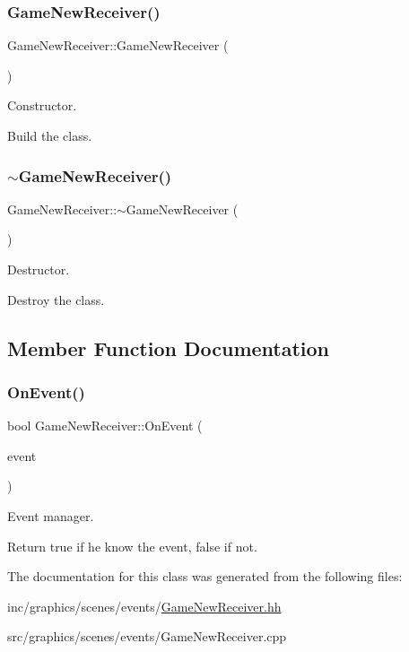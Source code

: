 \subsubsection{\texorpdfstring{Game\+New\+Receiver()}{GameNewReceiver()}}
{\footnotesize\ttfamily Game\+New\+Receiver\+::\+Game\+New\+Receiver (\begin{DoxyParamCaption}{ }\end{DoxyParamCaption})}



Constructor. 

Build the class. \mbox{\label{classGameNewReceiver_ab92b6653b56d291853a4e2f737eaf6fd}} 
\subsubsection{\texorpdfstring{$\sim$\+Game\+New\+Receiver()}{~GameNewReceiver()}}
{\footnotesize\ttfamily Game\+New\+Receiver\+::$\sim$\+Game\+New\+Receiver (\begin{DoxyParamCaption}{ }\end{DoxyParamCaption})}



Destructor. 

Destroy the class. 

\subsection{Member Function Documentation}
\mbox{\label{classGameNewReceiver_ad9ec097d8b46946ed1a21c24463fc0b6}} 
\subsubsection{\texorpdfstring{On\+Event()}{OnEvent()}}
{\footnotesize\ttfamily bool Game\+New\+Receiver\+::\+On\+Event (\begin{DoxyParamCaption}\item[{const irr\+::\+S\+Event \&}]{event }\end{DoxyParamCaption})}



Event manager. 

Return true if he know the event, false if not. 

The documentation for this class was generated from the following files\+:\begin{DoxyCompactItemize}
\item 
inc/graphics/scenes/events/\hyperlink{GameNewReceiver_8hh}{Game\+New\+Receiver.\+hh}\item 
src/graphics/scenes/events/Game\+New\+Receiver.\+cpp\end{DoxyCompactItemize}
